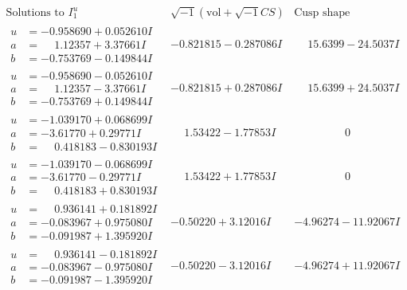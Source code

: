 \documentclass[1p]{elsarticle_modified}
\theoremstyle{definition}
\newcommand{\I}{\sqrt{-1}}
\begin{document}
$$\begin{array}{c|c|c}  
\text{Solutions to }I^u_{1}& \I (\text{vol} + \sqrt{-1}CS) & \text{Cusp shape}\\
 \hline 
\begin{aligned}
u &= -0.958690 + 0.052610 I \\
a &= \phantom{-}1.12357 + 3.37661 I \\
b &= -0.753769 - 0.149844 I\end{aligned}
 & -0.821815 - 0.287086 I & \phantom{-}15.6399 - 24.5037 I \\ \hline\begin{aligned}
u &= -0.958690 - 0.052610 I \\
a &= \phantom{-}1.12357 - 3.37661 I \\
b &= -0.753769 + 0.149844 I\end{aligned}
 & -0.821815 + 0.287086 I & \phantom{-}15.6399 + 24.5037 I \\ \hline\begin{aligned}
u &= -1.039170 + 0.068699 I \\
a &= -3.61770 + 0.29771 I \\
b &= \phantom{-}0.418183 - 0.830193 I\end{aligned}
 & \phantom{-}1.53422 - 1.77853 I & \phantom{-0.000000 } 0 \\ \hline\begin{aligned}
u &= -1.039170 - 0.068699 I \\
a &= -3.61770 - 0.29771 I \\
b &= \phantom{-}0.418183 + 0.830193 I\end{aligned}
 & \phantom{-}1.53422 + 1.77853 I & \phantom{-0.000000 } 0 \\ \hline\begin{aligned}
u &= \phantom{-}0.936141 + 0.181892 I \\
a &= -0.083967 + 0.975080 I \\
b &= -0.091987 + 1.395920 I\end{aligned}
 & -0.50220 + 3.12016 I & -4.96274 - 11.92067 I \\ \hline\begin{aligned}
u &= \phantom{-}0.936141 - 0.181892 I \\
a &= -0.083967 - 0.975080 I \\
b &= -0.091987 - 1.395920 I\end{aligned}
 & -0.50220 - 3.12016 I & -4.96274 + 11.92067 I \\ \hline\begin{aligned}

\end{aligned}
\end{array}$$
\end{document}
